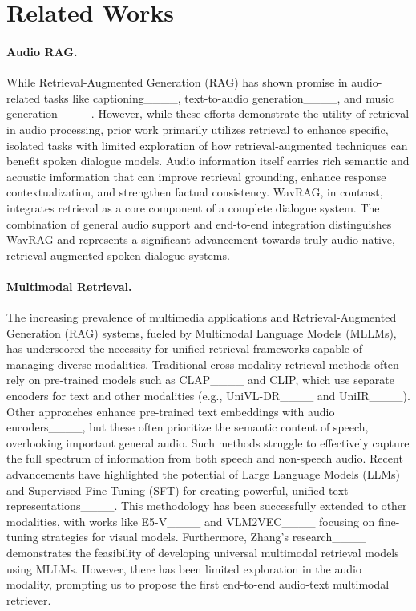 \section{Related Works}
\paragraph{Audio RAG.}
While Retrieval-Augmented Generation (RAG) has shown promise in audio-related tasks like captioning____, text-to-audio generation____, and music generation____. However, while these efforts demonstrate the utility of retrieval in audio processing,  prior work primarily utilizes retrieval to enhance specific, isolated tasks with limited exploration of how retrieval-augmented techniques can benefit spoken dialogue models. Audio information itself carries rich semantic and acoustic imformation that can improve retrieval grounding, enhance response contextualization, and strengthen factual consistency. WavRAG, in contrast, integrates retrieval as a core component of a complete dialogue system. The combination of general audio support and end-to-end integration distinguishes WavRAG and represents a significant advancement towards truly audio-native, retrieval-augmented spoken dialogue systems.

\paragraph{Multimodal Retrieval.}
The increasing prevalence of multimedia applications and Retrieval-Augmented Generation (RAG) systems, fueled by Multimodal Language Models (MLLMs), has underscored the necessity for unified retrieval frameworks capable of managing diverse modalities. Traditional cross-modality retrieval methods often rely on pre-trained models such as CLAP____ and CLIP, which use separate encoders for text and other modalities (e.g., UniVL-DR____ and UniIR____). Other approaches enhance pre-trained text embeddings with audio encoders____, but these often prioritize the semantic content of speech, overlooking important general audio. Such methods struggle to effectively capture the full spectrum of information from both speech and non-speech audio.
Recent advancements have highlighted the potential of Large Language Models (LLMs) and Supervised Fine-Tuning (SFT) for creating powerful, unified text representations____. This methodology has been successfully extended to other modalities, with works like E5-V____ and VLM2VEC____ focusing on fine-tuning strategies for visual models. Furthermore, Zhang's research____ demonstrates the feasibility of developing universal multimodal retrieval models using MLLMs. However, there has been limited exploration in the audio modality, prompting us to propose the first end-to-end audio-text multimodal retriever.


